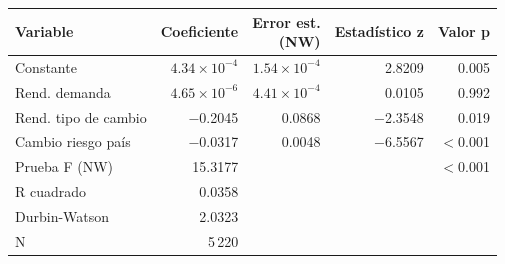 \begin{tabularx}{\linewidth}{>{\raggedright\arraybackslash}Xrrrr}
\toprule
Variable & Coeficiente & \makecell[r]{Error est.\\(NW)} & Estadístico z & Valor p \\
\midrule
Constante & $4.34\times10^{-4}$ & $1.54\times10^{-4}$ & 2.8209 & 0.005 \\
Rend. demanda & $4.65\times10^{-6}$ & $4.41\times10^{-4}$ & 0.0105 & 0.992 \\
Rend. tipo de cambio & $-$0.2045 & 0.0868 & $-$2.3548 & 0.019 \\
Cambio riesgo país & $-$0.0317 & 0.0048 & $-$6.5567 & $<$0.001 \\
Prueba F (NW) & 15.3177 &  &  & $<$0.001 \\
R cuadrado & 0.0358 &  &  &  \\
Durbin-Watson & 2.0323 &  &  &  \\
N & 5\,220 &  &  &  \\
\bottomrule
\end{tabularx}
